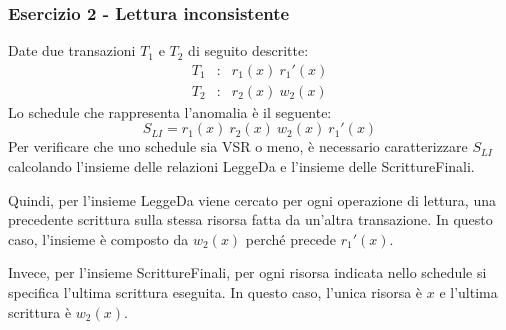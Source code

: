 \documentclass[a4paper]{article}
\begin{document}
	\subsubsection{Esercizio 2 - Lettura inconsistente}
	
	Date due transazioni $T_{1}$ e $T_{2}$ di seguito descritte:
	\begin{equation*}
		\begin{array}{lll}
			T_{1} &:& r_{1}\left(x\right) \: r_{1}'\left(x\right) \\
			T_{2} &:& r_{2}\left(x\right) \: w_{2}\left(x\right)
		\end{array}
	\end{equation*}
	Lo schedule che rappresenta l'anomalia è il seguente:
	\begin{equation*}
		S_{LI} = r_{1}\left(x\right) \: r_{2}\left(x\right) \: w_{2}\left(x\right) \: r_{1}'\left(x\right)
	\end{equation*}
	Per verificare che uno schedule sia VSR o meno, è necessario caratterizzare $S_{LI}$ calcolando l'insieme delle relazioni LeggeDa e l'insieme delle ScrittureFinali.\newline
	
	\noindent
	Quindi, per l'insieme LeggeDa viene cercato per ogni operazione di lettura, una precedente scrittura sulla stessa risorsa fatta da un'altra transazione. In questo caso, l'insieme è composto da $w_{2}\left(x\right)$ perché precede $r_{1}'\left(x\right)$.\newline
	
	\noindent
	Invece, per l'insieme ScrittureFinali, per ogni risorsa indicata nello schedule si specifica l'ultima scrittura eseguita. In questo caso, l'unica risorsa è $x$ e l'ultima scrittura è $w_{2}\left(x\right)$.\newline
	
\end{document}
